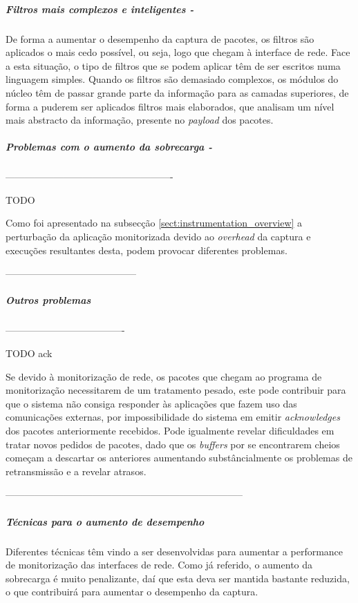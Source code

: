 \subparagraph*{Filtros mais complexos e inteligentes - }
De forma a aumentar o desempenho da captura de pacotes, os filtros são aplicados o mais cedo possível, ou seja, logo que chegam à interface de rede.
Face a esta situação, o tipo de filtros que se podem aplicar têm de ser escritos numa linguagem simples.
Quando os filtros são demasiado complexos, os módulos do núcleo têm de passar grande parte da informação para as camadas superiores, de forma a puderem ser aplicados filtros mais elaborados, que analisam um nível mais abstracto da informação, presente no \textit{payload} dos pacotes.


\subparagraph*{Problemas com o aumento da sobrecarga - }

----------------------------------------------------

TODO

Como foi apresentado na subsecção \ref{sect:instrumentation_overview} a perturbação da aplicação monitorizada devido ao \textit{overhead} da captura e execuções resultantes desta, podem provocar diferentes problemas.

-----------------------------------------

\subparagraph*{Outros problemas
}

-------------------------------------

TODO ack

Se devido à monitorização de rede, os pacotes que chegam ao programa de monitorização necessitarem de um tratamento pesado, este pode contribuir para que o sistema não consiga responder às aplicações que fazem uso das comunicações externas, por impossibilidade do sistema em emitir \textit{acknowledges} dos pacotes anteriormente recebidos.
Pode igualmente revelar dificuldades em tratar novos pedidos de pacotes, dado que os \textit{buffers} por se encontrarem cheios começam a descartar os anteriores aumentando substâncialmente os problemas de retransmissão e a revelar atrasos.

--------------------------------------------------------------------------

\subparagraph*{Técnicas para o aumento de desempenho}
Diferentes técnicas têm vindo a ser desenvolvidas para aumentar a performance de monitorização das interfaces de rede.
Como já referido, o aumento da sobrecarga é muito penalizante, daí que esta deva ser mantida bastante reduzida, o que contribuirá para aumentar o desempenho da captura.

